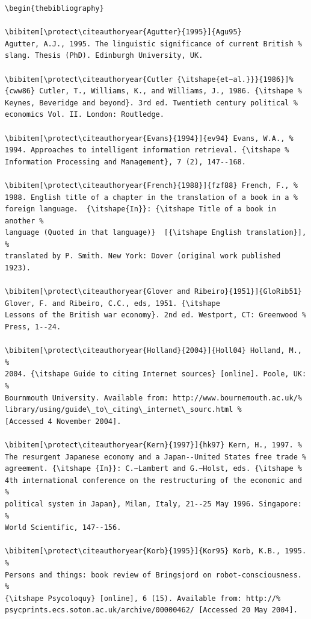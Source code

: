 \documentclass[]{tGIS2e}
\begin{document}
\begin{verbatim}
\begin{thebibliography}

\bibitem[\protect\citeauthoryear{Agutter}{1995}]{Agu95}
Agutter, A.J., 1995. The linguistic significance of current British %
slang. Thesis (PhD). Edinburgh University, UK.

\bibitem[\protect\citeauthoryear{Cutler {\itshape{et~al.}}}{1986}]%
{cww86} Cutler, T., Williams, K., and Williams, J., 1986. {\itshape %
Keynes, Beveridge and beyond}. 3rd ed. Twentieth century political %
economics Vol. II. London: Routledge.

\bibitem[\protect\citeauthoryear{Evans}{1994}]{ev94} Evans, W.A., %
1994. Approaches to intelligent information retrieval. {\itshape %
Information Processing and Management}, 7 (2), 147--168.

\bibitem[\protect\citeauthoryear{French}{1988}]{fzf88} French, F., %
1988. English title of a chapter in the translation of a book in a %
foreign language.  {\itshape{In}}: {\itshape Title of a book in another %
language (Quoted in that language)}  [{\itshape English translation}], %
translated by P. Smith. New York: Dover (original work published 1923).

\bibitem[\protect\citeauthoryear{Glover and Ribeiro}{1951}]{GloRib51}
Glover, F. and Ribeiro, C.C., eds, 1951. {\itshape
Lessons of the British war economy}. 2nd ed. Westport, CT: Greenwood %
Press, 1--24.

\bibitem[\protect\citeauthoryear{Holland}{2004}]{Holl04} Holland, M., %
2004. {\itshape Guide to citing Internet sources} [online]. Poole, UK: %
Bournmouth University. Available from: http://www.bournemouth.ac.uk/%
library/using/guide\_to\_citing\_internet\_sourc.html %
[Accessed 4 November 2004].

\bibitem[\protect\citeauthoryear{Kern}{1997}]{hk97} Kern, H., 1997. %
The resurgent Japanese economy and a Japan--United States free trade %
agreement. {\itshape {In}}: C.~Lambert and G.~Holst, eds. {\itshape %
4th international conference on the restructuring of the economic and %
political system in Japan}, Milan, Italy, 21--25 May 1996. Singapore: %
World Scientific, 147--156.

\bibitem[\protect\citeauthoryear{Korb}{1995}]{Kor95} Korb, K.B., 1995. %
Persons and things: book review of Bringsjord on robot-consciousness. %
{\itshape Psycoloquy} [online], 6 (15). Available from: http://%
psycprints.ecs.soton.ac.uk/archive/00000462/ [Accessed 20 May 2004].


\end{verbatim}
\end{document}
